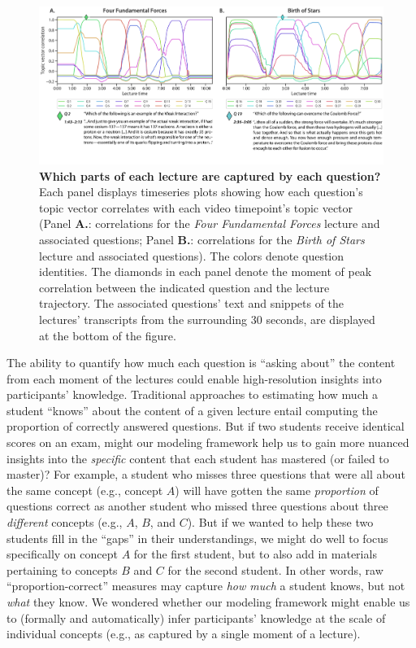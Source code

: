 \documentclass[10pt]{article}
\begin{document}
\begin{figure}[t]
    \centering
    \includegraphics[width=\textwidth]{figs/lecture-question-similarity}

    \caption{\textbf{Which parts of each lecture are captured by each
    question?} Each panel displays timeseries plots showing how each question's
    topic vector correlates with each video timepoint's topic vector (Panel
    \textbf{A.}: correlations for the \textit{Four Fundamental Forces} lecture
    and associated questions; Panel \textbf{B.}: correlations for the
    \textit{Birth of Stars} lecture and associated questions). The colors
    denote question identities. The diamonds in each panel denote the moment of
    peak correlation between the indicated question and the lecture trajectory.
    The associated questions' text and snippets of the lectures' transcripts
    from the surrounding 30 seconds, are displayed at the bottom of the
    figure.}

    \label{fig:question-correlations}
\end{figure}

The ability to quantify how much each question is ``asking about'' the content
from each moment of the lectures could enable high-resolution insights into
participants' knowledge. Traditional approaches to estimating how much a
student ``knows'' about the content of a given lecture entail computing the
proportion of correctly answered questions. But if two students receive
identical scores on an exam, might our modeling framework help us to gain more
nuanced insights into the \textit{specific} content that each student has
mastered (or failed to master)? For example, a student who misses three
questions that were all about the same concept (e.g., concept $A$) will have
gotten the same \textit{proportion} of questions correct as another student who
missed three questions about three \textit{different} concepts (e.g., $A$, $B$,
and $C$). But if we wanted to help these two students fill in the ``gaps'' in
their understandings, we might do well to focus specifically on concept $A$ for
the first student, but to also add in materials pertaining to concepts $B$ and
$C$ for the second student. In other words, raw ``proportion-correct'' measures
may capture \textit{how much} a student knows, but not \textit{what} they know.
We wondered whether our modeling framework might enable us to (formally and
automatically) infer participants' knowledge at the scale of individual
concepts (e.g., as captured by a single moment of a lecture).
\end{document}
